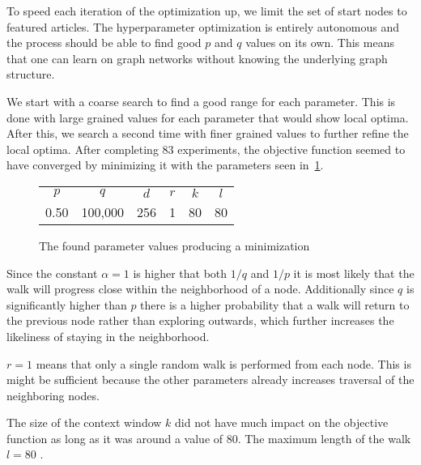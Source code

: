 To speed each iteration of the optimization up, we limit the set of start nodes to featured articles. The hyperparameter optimization is entirely autonomous and the process should be able to find good $p$ and $q$ values on its own. This means that one can learn on graph networks without knowing the underlying graph structure.

We start with a coarse search to find a good range for each parameter. This is done with large grained values for each parameter that would show local optima. After this, we search a second time with finer grained values to further refine the local optima. After completing 83 experiments, the objective function seemed to have converged by minimizing it with the parameters seen in~\cref{tab:paramopt_goodvalues}.

\begin{figure}%
\centering
\begin{tabular}{cccccc}
\toprule
$p$  & $q$     & $d$ & $r$ & $k$ & $l$ \\
0.50 & 100,000 & 256 & 1   & 80  & 80 \\
\bottomrule
\end{tabular}
\caption[The found parameter values producing a minimization]{The found parameter values producing a minimization }%
\label{tab:paramopt_goodvalues}%
\end{figure}


Since the constant $\alpha = 1$ is higher that both $1/q$ and $1/p$ it is most likely that the walk will progress close within the neighborhood of a node. Additionally since $q$ is significantly higher than $p$ there is a higher probability that a walk will return to the previous node rather than exploring outwards, which further increases the likeliness of staying in the neighborhood.

$r=1$ means that only a single random walk is performed from each node. This is might be sufficient because the other parameters already increases traversal of the neighboring nodes.

The size of the context window $k$ did not have much impact on the objective function as long as it was around a value of 80. The maximum length of the walk $l=80$ .

